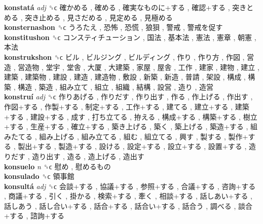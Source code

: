 \textbf{konstatá} \emph{adj}  ␝ϲ   確かめる ,  確める ,  確実なものに+する ,  確認+する ,  突きとめる ,  突き止める ,  見さだめる ,  見定める ,  見極める   \\
\textbf{konsternashon} ␝ϲ   うろたえ ,  恐怖 ,  恐慌 ,  狼狽 ,  警戒 ,  警戒を促す   \\
\textbf{konstitushon} ␝ϲ   コンスティチューション ,  国法 ,  基本法 ,  憲法 ,  憲章 ,  朝憲 ,  本法   \\
\textbf{konstrukshon} ␝ϲ   ビル ,  ビルジング ,  ビルディング ,  作り ,  作り方 ,  作図 ,  営造 ,  営造物 ,  堂宇 ,  堂舎 ,  大厦 ,  大建築 ,  家屋 ,  屋舎 ,  工作 ,  建家 ,  建物 ,  建立 ,  建築 ,  建築物 ,  建設 ,  建造 ,  建造物 ,  敷設 ,  新築 ,  新造 ,  普請 ,  架設 ,  構成 ,  構築 ,  構造 ,  築造 ,  組み立て ,  組立 ,  組織 ,  結構 ,  設営 ,  造り ,  造営   \\
\textbf{konstruí} \emph{adj}  ␝ϲ   作りあげる ,  作りだす ,  作り出す ,  作る ,  作上げる ,  作出す ,  作図+する ,  作製+する ,  制定+する ,  工作+する ,  建てる ,  建立+する ,  建築+する ,  建設+する ,  成す ,  打ち立てる ,  拵える ,  構成+する ,  構築+する ,  樹立+する ,  生産+する ,  確立+する ,  築き上げる ,  築く ,  築上げる ,  築造+する ,  組みたてる ,  組み上げる ,  組み立てる ,  組む ,  組立てる ,  興す ,  製する ,  製作+する ,  製出+する ,  製造+する ,  設ける ,  設定+する ,  設立+する ,  設置+する ,  造りだす ,  造り出す ,  造る ,  造上げる ,  造出す   \\
\textbf{konsuelo} \emph{n}  ␝ϲ   慰め ,  慰めるもの   \\
\textbf{konsulado} ␝ϲ   領事館   \\
\textbf{konsultá} \emph{adj}  ␝ϲ   会談+する ,  協議+する ,  参照+する ,  合議+する ,  咨詢+する ,  商議+する ,  引く ,  掛かる ,  検索+する ,  牽く ,  相談+する ,  話しあい+する ,  話しあう ,  話し合い+する ,  話合+する ,  話合い+する ,  話合う ,  調べる ,  談合+する ,  諮詢+する   \\

